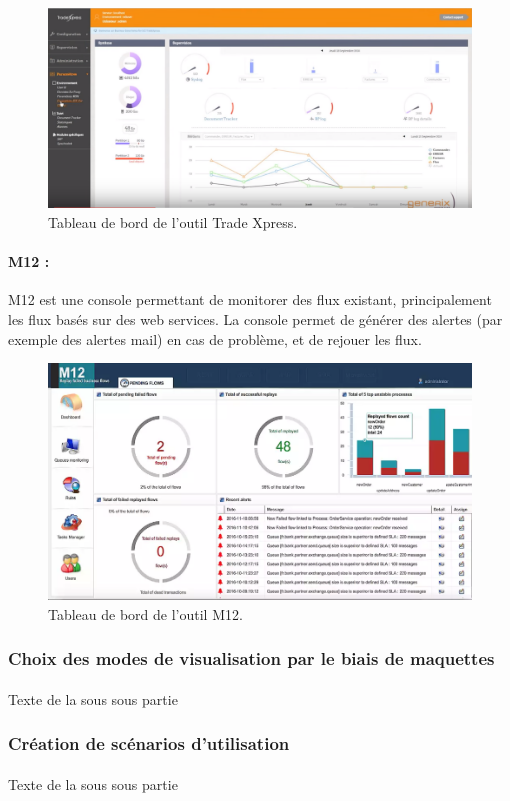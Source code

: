 			\begin{figure}[h]
				\centering
				\includegraphics[width=17cm]{../img/part2/trade_xpress.png}
				\caption{\label{trade_xpress} Tableau de bord de l'outil Trade Xpress.}
			\end{figure}
			
			\paragraph{M12 :}
			M12 est une console permettant de monitorer des flux existant, principalement
			les flux basés sur des web services. La console permet de générer des
			alertes (par exemple des alertes mail) en cas de problème, et de rejouer les
			flux.
			\begin{figure}[h]
				\centering
				\includegraphics[width=17cm]{../img/part2/m12.png}
				\caption{\label{m12} Tableau de bord de l'outil M12.}
			\end{figure}
			
		\subsubsection{Choix des modes de visualisation par le biais de maquettes}
			\paragraph{}
			Texte de la sous sous partie
		\subsubsection{Création de scénarios d'utilisation}
			\paragraph{}
			Texte de la sous sous partie
